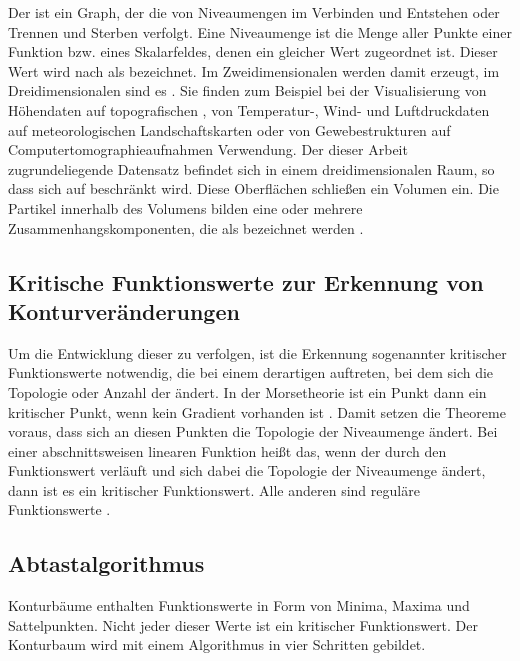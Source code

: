 Der  ist ein Graph, der die  von Niveaumengen im Verbinden und Entstehen oder Trennen und Sterben verfolgt. Eine Niveaumenge ist die Menge aller Punkte einer Funktion bzw. eines Skalarfeldes, denen ein gleicher Wert zugeordnet ist. Dieser Wert wird nach \cite[S.~1]{carr2010flexibleIsosurfaces} als  bezeichnet. Im Zweidimensionalen werden damit  erzeugt, im Dreidimensionalen sind es . Sie finden zum Beispiel bei der Visualisierung von Höhendaten auf topografischen \cite{hurni2010landform} \cite{openstreetmapContours}, von Temperatur-, Wind- und Luftdruckdaten auf meteorologischen Landschaftskarten \cite{hopkins1996weather} oder von Gewebestrukturen auf Computertomographieaufnahmen \cite{tang2014ctImages} Verwendung.
Der dieser Arbeit zugrundeliegende Datensatz befindet sich in einem dreidimensionalen Raum, so dass sich auf  beschränkt wird. Diese Oberflächen schließen ein Volumen ein. Die Partikel innerhalb des Volumens bilden eine oder mehrere Zusammenhangskomponenten, die als  bezeichnet werden \cite[S.~2]{carr2001computingCountourTrees}.

\subsection*{Kritische Funktionswerte zur Erkennung von Konturveränderungen}
Um die Entwicklung dieser  zu verfolgen, ist die Erkennung sogenannter kritischer Funktionswerte notwendig, die bei einem derartigen  auftreten, bei dem sich die Topologie oder Anzahl der  ändert. In der Morsetheorie ist ein Punkt dann ein kritischer Punkt, wenn kein Gradient vorhanden ist  \cite{milnor1963morse} \cite{shinagawa1991surfaceBasedOnMorse}. Damit setzen die Theoreme voraus, dass sich an diesen Punkten die Topologie der Niveaumenge ändert. Bei einer abschnittsweisen linearen Funktion heißt das, wenn der  durch den Funktionswert verläuft und sich dabei die Topologie der Niveaumenge ändert, dann ist es ein kritischer Funktionswert. Alle anderen sind reguläre Funktionswerte \cite{carr2010flexibleIsosurfaces} \cite{chiang2005contourTreesUsingMonotonePaths}.

\subsection*{Abtastalgorithmus}\label{sec:related:konturAbtast}
Konturbäume enthalten Funktionswerte in Form von Minima, Maxima und Sattelpunkten. Nicht jeder dieser Werte ist ein kritischer Funktionswert. Der Konturbaum wird mit einem Algorithmus in vier Schritten gebildet.

